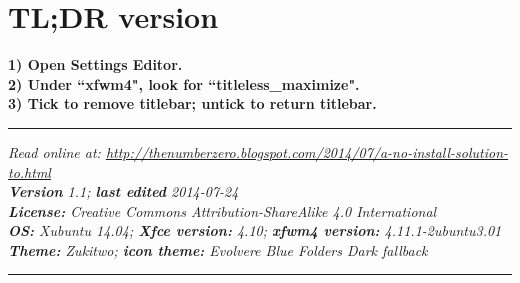 \documentclass[12pt, a4paper]{article}
\begin{document}
\section*{TL;DR version}

\textbf{1) Open Settings Editor.\\
2) Under ``xfwm4", look for ``titleless\_maximize".\\
3) Tick to remove titlebar; untick to return titlebar.}\\

\vspace{5cm}
\hrule
\noindent \center \emph{Read online at: \url{http://thenumberzero.blogspot.com/2014/07/a-no-install-solution-to.html}\\
\textbf{Version} 1.1; \textbf{last edited} 2014-07-24\\
\textbf{License:} Creative Commons Attribution-ShareAlike 4.0 International\\
\textbf{OS:} Xubuntu 14.04; \textbf{Xfce version:} 4.10; \textbf{xfwm4 version:} 4.11.1-2ubuntu3.01\\ \textbf{Theme:} Zukitwo; \textbf{icon theme:} Evolvere Blue Folders Dark fallback}
\vspace{1em}
\hrule
\end{document}
